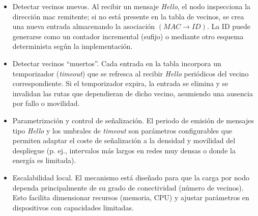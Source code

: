 \begin{itemize}
    \item Detectar vecinos nuevos. Al recibir un mensaje \textit{Hello}, el nodo inspecciona la dirección \gls{mac} remitente; si no está presente en la tabla de vecinos, se crea una nueva entrada almacenando la asociación \((MAC \rightarrow ID)\). La ID puede generarse como un contador incremental (sufijo) o mediante otro esquema determinista según la implementación.
    
    \item Detectar vecinos ``muertos''. Cada entrada en la tabla incorpora un temporizador (\textit{timeout}) que se refresca al recibir \textit{Hello} periódicos del vecino correspondiente. Si el temporizador expira, la entrada se elimina y se invalidan las rutas que dependieran de dicho vecino, asumiendo una ausencia por fallo o movilidad.
    
    \item Parametrización y control de señalización. El periodo de emisión de mensajes tipo \textit{Hello} y los umbrales de \textit{timeout} son parámetros configurables que permiten adaptar el coste de señalización a la densidad y movilidad del despliegue (p. ej., intervalos más largos en redes muy densas o donde la energía es limitada).
    
    \item Escalabilidad local. El mecanismo está diseñado para que la carga por nodo dependa principalmente de su grado de conectividad (número de vecinos). Esto facilita dimensionar recursos (memoria, CPU) y ajustar parámetros en dispositivos con capacidades limitadas.
\end{itemize}



